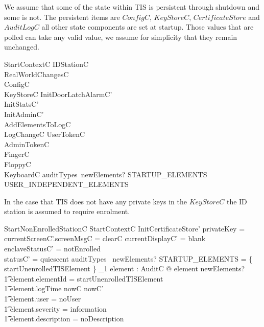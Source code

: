 We assume that some of the state within TIS is persistent through
shutdown and some is not. 
The persistent items are $ConfigC$, $KeyStoreC$, $CertificateStore$  and $AuditLogC$ all other state
components are set at startup. Those values that are polled can take
any valid value, we assume for simplicity that they remain unchanged.

\begin{schema}{StartContextC}
        \Delta IDStationC
\\      RealWorldChangesC
\also
\\      \Xi ConfigC
\\      \Xi KeyStoreC
\also
	InitDoorLatchAlarmC'
\\      InitStatsC'
\\      InitAdminC'
\\      AddElementsToLogC
\\      LogChangeC
\also
        \Xi UserTokenC  
\\      \Xi AdminTokenC 
\\      \Xi FingerC
\\      \Xi FloppyC 
\\      \Xi KeyboardC 
\where
        auditTypes~newElements? \subseteq STARTUP\_ELEMENTS \cup USER\_INDEPENDENT\_ELEMENTS
\end{schema}

In the case that TIS does not have any private keys in the $KeyStoreC$ 
the ID station is assumed to require enrolment.

\begin{schema}{StartNonEnrolledStationC}
        StartContextC
\also
        InitCertificateStore'
\where 
        privateKey = \Nil
\also
        currentScreenC'.screenMsgC = clearC
\also
	currentDisplayC' = blank
\\	enclaveStatusC' = notEnrolled
\\      statusC' = quiescent
\also
        auditTypes~ newElements? \cap STARTUP\_ELEMENTS = 
        \{ startUnenrolledTISElement \} 
\also
        \exists_1 element : AuditC @ element \in newElements? 
\\ \t1  \land element.elementId = startUnenrolledTISElement
\\ \t1  \land element.logTime \in nowC \upto nowC'
\\ \t1  \land element.user = noUser
\\ \t1  \land element.severity = information
\\ \t1  \land element.description = noDescription
\end{schema}

